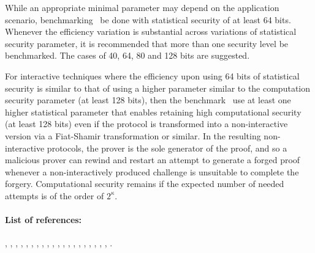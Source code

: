	While an appropriate minimal parameter may depend on the application scenario, benchmarking \shall\ be done with statistical security of at least 64 bits.
	Whenever the efficiency variation is substantial across variations of statistical security parameter, it is recommended that more than one security level be benchmarked. 
    The cases of 40, 64, 80 and 128 bits are suggested.

	For interactive techniques where the efficiency upon using 64 bits of statistical security is similar to that of using a higher parameter similar to the computation security parameter (at least 128 bits), then the benchmark \should\ use at least one higher statistical parameter that enables retaining high computational security (at least 128 bits) even if the protocol is transformed into a non-interactive version via a Fiat-Shamir transformation or similar.
	In the resulting non-interactive protocols, the prover is the sole generator of the proof, and so a malicious prover can rewind and restart an attempt to generate a forged proof
whenever a non-interactively produced challenge is unsuitable to complete the forgery.
	Computational security remains if the expected number of needed attempts is of the order of $2^{\kappa}$.
	\loosen


\paragraph{List of references:}
\cite{2013:tcc:snargs-via-LIPs},
\cite{2016:tcc:IOPs},
\cite{2017:eurocrypt:lattice-based-snargs},
\cite{2016:eurocrypt:efficient-zk-args-for-arithmetic},
\cite{2017:asiacrypt:linear-time-zkps-for-arithmetic},
\cite{2018:asiacrypt:arya-nearly-lineat-time-zkps-for-correct},
\cite{1998:crypto:zkps-for-finite-field-arithmetic},
\cite{2013:QSPs-and-succinct-NIZKs-without-PCPs},
\cite{2015:JACM:delegating-computation-interactive-proofs-for-muggles},
\cite{2010:asiacrypt:short-NIZKPs},
\cite{2018:SP:Doubly-efficient-zkSNARKs-without-trusted-setup},
\cite{2007:stoc:ZK-from-SMPC},
\cite{2012:tcc:On-Efficient-ZK-PCPs},
\cite{1995:crypto:Improved-Efficient-Arguments},
\cite{2008:icalp:interactive-PCP},
\cite{2017:ccs:ligero},
\cite{2000:SIAM:Computationally-Sound-Proofs},
\cite{2016:stoc:Constant-round-Interactive-Proofs-for-Delegating-Computation},
\cite{2018:SP:vRAM},
\cite{2017:SP:vSQL},
\cite{2016:Sec:ZKBoo}.


